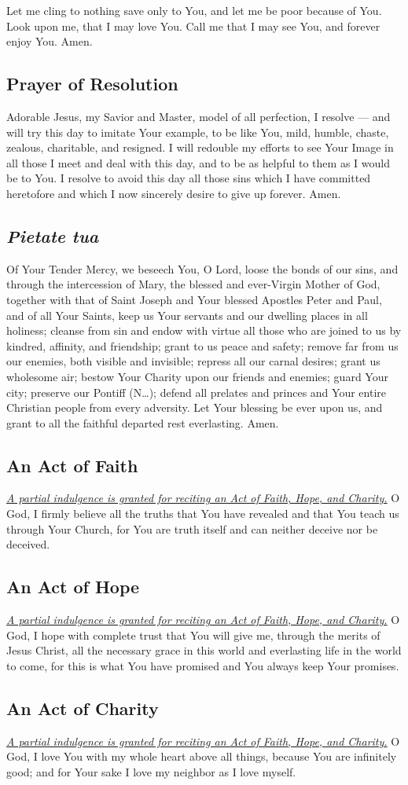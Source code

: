 \documentclass[12pt]{article}
\newcommand{\prayertitle}[1]{\subsection{#1}}
\newcommand{\indulgencedprayertitle}[1]{\prayertitle{#1 \protect\kreuz}}
\newcommand{\insertname}{(N\dots)\xspace}
\newcommand{\emphasis}[1]{\emph{#1}}
\newcommand{\emphasis}[1]{\textsl{#1}}
\newcommand{\foreign}[1]{\emphasis{#1}}
\newcommand{\note}[1]{{\small{\emphasis{#1}}}\newline}
\newcommand{\linkednote}[2]{\hyperlink{#1}{\note{#2}}}
\begin{document}
Let me cling to nothing save only to You,
and let me be poor because of You.
Look upon me, that I may love You.
Call me that I may see You,
and forever enjoy You.
Amen.

\prayertitle{Prayer of Resolution}
\label{prayer:resolution}
Adorable Jesus, my Savior and Master, model of all perfection, I resolve --- and will try this day \textemdash{} to imitate Your example, to be like You, mild, humble, chaste, zealous, charitable, and resigned.
I will redouble my efforts to see Your Image in all those I meet and deal with this day, and to be as helpful to them as I would be to You.
I resolve to avoid this day all those sins which I have committed heretofore and which I now sincerely desire to give up forever. Amen.

\prayertitle{\foreign{Pietate tua}}
\label{prayer:pietate_tua}
Of Your Tender Mercy, we beseech You, O Lord, loose the bonds of our sins, and through the intercession of Mary, the blessed and ever-Virgin Mother of God, together with that of Saint Joseph and Your blessed Apostles Peter and Paul, and of all Your Saints, keep us Your servants and our dwelling places in all holiness;
cleanse from sin and endow with virtue all those who are joined to us by kindred, affinity, and friendship;
grant to us peace and safety;
remove far from us our enemies, both visible and invisible;
repress all our carnal desires;
grant us wholesome air;
bestow Your Charity upon our friends and enemies;
guard Your city;
preserve our Pontiff \insertname;
defend all prelates and princes and Your entire Christian people from every adversity.
Let Your blessing be ever upon us, and grant to all the faithful departed rest everlasting.
Amen.

\indulgencedprayertitle{An Act of Faith}
\label{prayer:act_of_faith}
\linkednote{grant28}{A partial indulgence is granted for reciting an Act of Faith, Hope, and Charity.}
O God,
I firmly believe all the truths that You have revealed and that You teach us through Your Church, for You are truth itself and can neither deceive nor be deceived.

\indulgencedprayertitle{An Act of Hope}
\linkednote{grant28}{A partial indulgence is granted for reciting an Act of Faith, Hope, and Charity.}
O God,
I hope with complete trust that You will give me, through the merits of Jesus Christ, all the necessary grace in this world and everlasting life in the world to come, for this is what You have promised and You always keep Your promises.

\indulgencedprayertitle{An Act of Charity}
\linkednote{grant28}{A partial indulgence is granted for reciting an Act of Faith, Hope, and Charity.}
O God,
I love You with my whole heart above all things, because You are infinitely good; and for Your sake I love my neighbor as I love myself.
\end{document}
